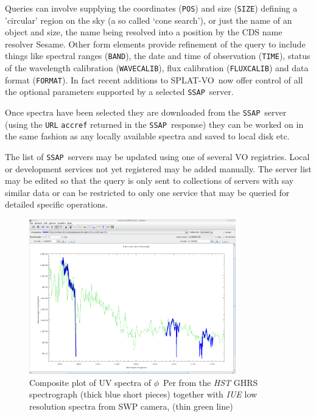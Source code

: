\documentclass[final,authoryear,5p,times,twocolumn]{elsarticle}
\newcommand{\ssap}{\texttt{SSAP}}
\newcommand{\splatvo}{{\textsf{\small{SPLAT-VO}}}}
\newcommand{\Sesame}{\textsf{\small Sesame}}
\begin{document}
Queries can involve supplying the coordinates (\texttt{POS}) and size
(\texttt{SIZE}) defining a 'circular' region on the sky (a so called `cone
search'), or just the name of an object and size, the name being resolved into
a position by the CDS name resolver \Sesame . Other form elements provide
refinement of the query to include things like spectral ranges
(\texttt{BAND}), the date and time of observation (\texttt{TIME}), status of
the wavelength calibration (\texttt{WAVECALIB}), flux calibration
(\texttt{FLUXCALIB}) and data format (\texttt{FORMAT}).  In fact recent
additions to \splatvo\ now offer control of all the optional parameters
supported by a selected \ssap\ server.

Once spectra have been selected they are downloaded from the \ssap\ server
(using the \texttt{URL} \texttt{accref} returned in the \ssap\ response) they
can be worked on in the same fashion as any locally available spectra and
saved to local disk etc.

The list of \ssap\ servers may be updated using one of several VO registries.
Local or development services not yet registered may be added manually. The
server list may be edited so that the query is only sent to collections of
servers with say similar data or can be restricted to only one service that
may be queried for detailed specific operations.



\begin{figure}[th]
\begin{center}
\includegraphics[width=0.8\textwidth]{iuehst2.pdf}
\caption{Composite plot of UV spectra of $\phi$~Per from the \emph{HST} GHRS
  spectrograph (thick blue short pieces) 
together with \emph{IUE} low resolution spectra
  from SWP camera, 
(thin green line)}
\label{fig:iuehst2}
\end{center}
\end{figure}
\end{document}
